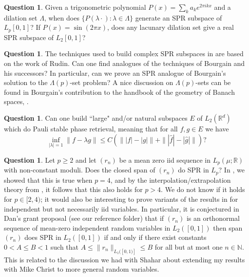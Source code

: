 \documentclass[12pt,leqno]{amsart}
\numberwithin{equation}{section}
\theoremstyle{plain}
\theoremstyle{definition}
\newtheorem{question}[theorem]{Question}
\begin{document}
 \begin{question}
Given a trigonometric polynomial $P(x)=\sum_k a_k e^{2\pi i kx}$ and a dilation set $\Lambda$, when does $\{P(\lambda \cdot) : \lambda\in \Lambda\}$ generate an SPR subspace of $L_p[0,1]$? If $P(x) = \sin(2\pi x)$, does any lacunary dilation set give a real SPR subspace of $L_2[0,1]$?
 \end{question}
 \begin{question}
 The techniques used to build complex SPR subspaces in \cite{Stable} are based on the work of Rudin. Can one find analogues of the techniques of Bourgain and his successors? In particular, can we prove an SPR analogue of Bourgain's solution to the $\Lambda(p)$-set problem? A  nice discussion on $\Lambda(p)$-sets can be found in Bourgain's contribution to the handbook of the geometry of Banach spaces, \cite{MR1863693}.
 \end{question}
 \begin{question}
Can one build ``large" and/or natural subspaces $E$ of $L_2(\mathbb{R}^d)$ which do Pauli
stable phase retrieval, meaning that for all $f,g\in E$ we have 
$$\inf_{|\lambda|=1}\|f-\lambda g\|\leq C\left( \||f|-|g|\|+\||\widehat{f}|-|\widehat{g}|\|\right)?$$
 \end{question}
 \begin{question}
Let $p \geq 2$ and let $(r_n)$ be a mean zero iid sequence in $L_p(\mu; \mathbb{R})$ with non-constant moduli. Does the closed span of $(r_n)$ do SPR in $L_p$? In \cite{Stable}, we showed that this is true when $p = 4$, and by the interpolation/extrapolation theory from \cite{Stablephaseretrieval}, it follows that this also holds for $p > 4$. We do not know if it holds for $p\in [2,4)$; it would also be interesting to prove variants of the results in \cite{Stable} for independent but not necessarily iid variables.  In particular, it is conjectured in Dan's grant proposal (see our reference folder) that if $(r_n)$ is an orthonormal sequence of mean-zero independent random variables in $L_2([0,1])$ then span$(r_n)$ does SPR in $L_2([0,1])$ if and only if there exist constants $0<A\leq B<1$ such that $A\leq \|r_n\|_{L_1([0,1)]} \leq B$ for all but at most one $n\in \mathbb{N}$. This is related to the discussion we had with Shahar about extending my results with Mike Christ to more general random variables.
 \end{question}
\end{document}
